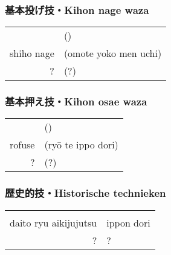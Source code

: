 \subsubsection{基本投げ技・Kihon nage waza}
\begin{table}[H]
\begin{center}
\begin{tabular}{rl}
    \ruby{}{} & (\ruby{}{})\\
    shiho nage & (omote yoko men uchi)\\
    ? & (?)
\end{tabular}
\end{center}
\label{kyuu_5_kihon_nage_waza}
\end{table}

\subsubsection{基本押え技・Kihon osae waza}
\begin{table}[H]
\begin{center}
\begin{tabular}{rl}
    \ruby{}{} & (\ruby{}{})\\
    rofuse & (ry\={o} te ippo dori)\\
    ? & (?)
\end{tabular}
\end{center}
\label{kyuu_5_kihon_osae_waza}
\end{table}

\subsubsection{歴史的技・Historische technieken}
\begin{table}[H]
\begin{center}
\begin{tabular}{rl}
    \ruby{}{}\ruby{}{} & \\
    daito ryu aikijujutsu & ippon dori\\
    ? & ?
\end{tabular}
\end{center}
\label{kyuu_5_historic}
\end{table}
